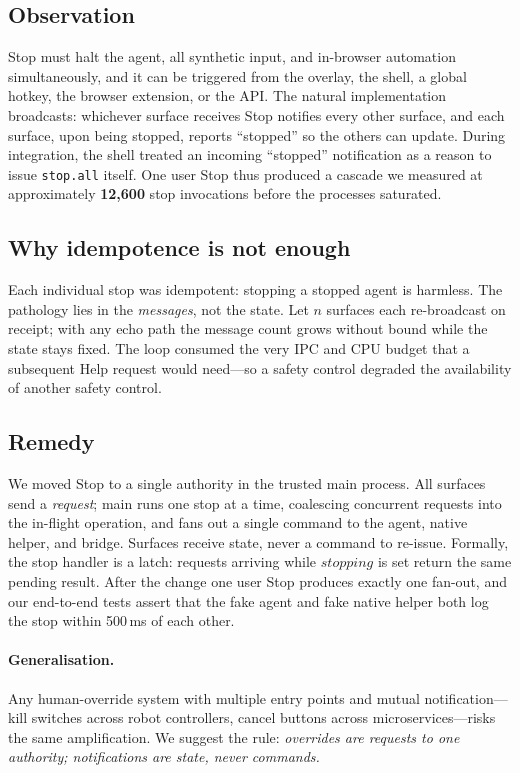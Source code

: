 \documentclass[11pt]{article}
\begin{document}
\subsection{Observation}
Stop must halt the agent, all synthetic input, and in-browser automation simultaneously, and it can be triggered from the overlay, the shell, a global hotkey, the browser extension, or the API. The natural implementation broadcasts: whichever surface receives Stop notifies every other surface, and each surface, upon being stopped, reports ``stopped'' so the others can update. During integration, the shell treated an incoming ``stopped'' notification as a reason to issue \texttt{stop.all} itself. One user Stop thus produced a cascade we measured at approximately \textbf{12{,}600} stop invocations before the processes saturated.

\subsection{Why idempotence is not enough}
Each individual stop was idempotent: stopping a stopped agent is harmless. The pathology lies in the \emph{messages}, not the state. Let $n$ surfaces each re-broadcast on receipt; with any echo path the message count grows without bound while the state stays fixed. The loop consumed the very IPC and CPU budget that a subsequent Help request would need---so a safety control degraded the availability of another safety control.

\subsection{Remedy}
We moved Stop to a single authority in the trusted main process. All surfaces send a \emph{request}; main runs one stop at a time, coalescing concurrent requests into the in-flight operation, and fans out a single command to the agent, native helper, and bridge. Surfaces receive state, never a command to re-issue. Formally, the stop handler is a latch: requests arriving while $\mathit{stopping}$ is set return the same pending result. After the change one user Stop produces exactly one fan-out, and our end-to-end tests assert that the fake agent and fake native helper both log the stop within 500\,ms of each other.

\paragraph{Generalisation.} Any human-override system with multiple entry points and mutual notification---kill switches across robot controllers, cancel buttons across microservices---risks the same amplification. We suggest the rule: \emph{overrides are requests to one authority; notifications are state, never commands.}
\end{document}
